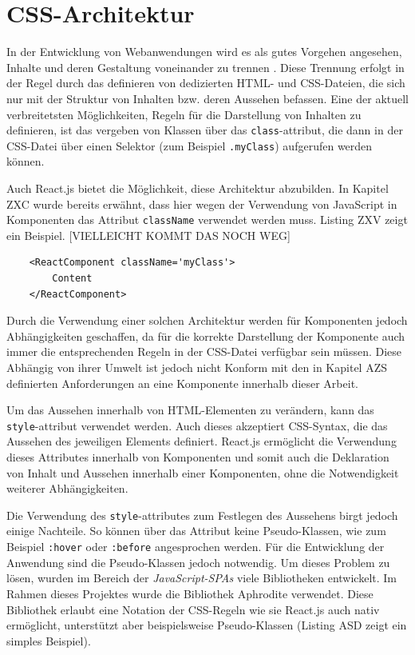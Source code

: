 \section{CSS-Architektur}
In der Entwicklung von Webanwendungen wird es als gutes Vorgehen angesehen, Inhalte und deren Gestaltung voneinander zu trennen \cite[S. 56]{goodman2002dynamic}. Diese Trennung erfolgt in der Regel durch das definieren von dedizierten HTML- und CSS-Dateien, die sich nur mit der Struktur von Inhalten bzw. deren Aussehen befassen.
Eine der aktuell verbreitetsten Möglichkeiten, Regeln für die Darstellung von Inhalten zu definieren, ist das vergeben von Klassen über das \verb|class|-attribut, die dann in der CSS-Datei über einen Selektor (zum Beispiel \verb|.myClass|) aufgerufen werden können.

Auch React.js bietet die Möglichkeit, diese Architektur abzubilden. In Kapitel ZXC wurde bereits erwähnt, dass hier wegen der Verwendung von JavaScript in Komponenten das Attribut \verb|className| verwendet werden muss. Listing ZXV zeigt ein Beispiel. [VIELLEICHT KOMMT DAS NOCH WEG]

\begin{lstlisting}
	<ReactComponent className='myClass'>
	 	Content
	</ReactComponent>
\end{lstlisting}

Durch die Verwendung einer solchen Architektur werden für Komponenten jedoch Abhängigkeiten geschaffen, da für die korrekte Darstellung der Komponente auch immer die entsprechenden Regeln in der CSS-Datei verfügbar sein müssen.
Diese Abhängig von ihrer Umwelt ist jedoch nicht Konform mit den in Kapitel AZS definierten Anforderungen an eine Komponente innerhalb dieser Arbeit.

Um das Aussehen innerhalb von HTML-Elementen zu verändern, kann das \verb|style|-attribut verwendet werden. Auch dieses akzeptiert CSS-Syntax, die das Aussehen des jeweiligen Elements definiert.
React.js ermöglicht die Verwendung dieses Attributes innerhalb von Komponenten und somit auch die Deklaration von Inhalt und Aussehen innerhalb einer Komponenten, ohne die Notwendigkeit weiterer Abhängigkeiten.

Die Verwendung des \verb|style|-attributes zum Festlegen des Aussehens birgt jedoch einige Nachteile. So können über das Attribut keine Pseudo-Klassen, wie zum Beispiel \verb|:hover| oder \verb|:before| angesprochen werden. \cite{w3c2017styles}
Für die Entwicklung der Anwendung sind die Pseudo-Klassen jedoch notwendig.
Um dieses Problem zu lösen, wurden im Bereich der \textit{JavaScript-SPAs} viele Bibliotheken entwickelt. Im Rahmen dieses Projektes wurde die Bibliothek Aphrodite\footnotemark{} verwendet.
Diese Bibliothek erlaubt eine Notation der CSS-Regeln wie sie React.js auch nativ ermöglicht, unterstützt aber beispielsweise Pseudo-Klassen (Listing ASD zeigt ein simples Beispiel).

